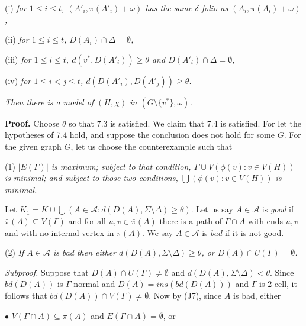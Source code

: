 \hspace*{12pt}(i) \textit{for $1 \le i \le t$, $(A'_i, \pi(A'_i) + \omega)$ has the same $\delta$-folio as $(A_i, \pi(A_i) + \omega)$,}

\hspace*{12pt}(ii) \textit{for $1 \le i \le t$, $D(A_i) \cap \Delta = \emptyset$,}

\hspace*{12pt}(iii) \textit{for $1 \le i \le t$, $d(v^*, D(A'_i)) \ge \theta$ and $D(A'_i) \cap \Delta = \emptyset$,}

\hspace*{12pt}(iv) \textit{for $1 \le i < j \le t$, $d(D(A'_i), D(A'_j)) \ge \theta$.}

\textit{Then there is a model of $(H, \chi)$ in $(G \setminus \{v^*\}, \omega)$.}

\textbf{Proof.} Choose $\theta$ so that 7.3 is satisfied. We claim that 7.4 is satisfied. For let the hypotheses of 7.4 hold, and suppose the conclusion does not hold for some $G$. For the given graph $G$, let us choose the counterexample such that

\hspace*{12pt}(1) \textit{$|E(\Gamma)|$ is maximum; subject to that condition, $\Gamma \cup V(\phi(v) \colon v \in V(H))$ is minimal; and subject to those two conditions, $\bigcup(\phi(v) \colon v \in V(H))$ is minimal.}

Let $K_1 = K \cup \bigcup(A \in \mathcal{A} \colon d(D(A), \Sigma \setminus \Delta) \ge \theta)$. Let us say $A \in \mathcal{A}$ is \textit{good} if $\bar{\pi}(A) \subseteq V(\Gamma)$ and for all $u, v \in \bar{\pi}(A)$ there is a path of $\Gamma \cap A$ with ends $u, v$ and with no internal vertex in $\bar{\pi}(A)$. We say $A \in \mathcal{A}$ is \textit{bad} if it is not good.

\hspace*{12pt}(2) \textit{If $A \in \mathcal{A}$ is bad then either $d(D(A), \Sigma \setminus \Delta) \ge \theta$, or $D(A) \cap U(\Gamma) = \emptyset$.}

\textit{Subproof.} Suppose that $D(A) \cap U(\Gamma) \ne \emptyset$ and $d(D(A), \Sigma \setminus \Delta) < \theta$. Since $bd(D(A))$ is $\Gamma$-normal and $D(A) = ins(bd(D(A)))$ and $\Gamma$ is 2-cell, it follows that $bd(D(A)) \cap V(\Gamma) \ne \emptyset$. Now by (J7), since $A$ is bad, either

\hspace*{12pt}$\bullet$ $V(\Gamma \cap A) \subseteq \bar{\pi}(A)$ and $E(\Gamma \cap A) = \emptyset$, or

